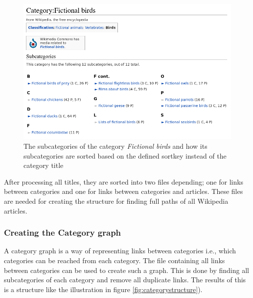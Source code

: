 \begin{figure}[h]
\centering
\includegraphics[width=\textwidth]{Chapters/Implementation/Fictional_birds_2}
\caption{The subcategories of the category \emph{Fictional birds} and how its subcategories are sorted based on the defined sortkey instead of the category title }
\label{fig:fictionalbirds}
\end{figure}


After processing all titles, they are sorted into two files depending; one for links between categories and one for links between categories and articles. These files are needed for creating the structure for finding full paths of all Wikipedia articles. 



\subsubsection{Creating the Category graph}
A category graph is a way of representing links between categories i.e., which categories can be reached from each category. The file containing all links between categories can be used to create such a graph. This is done by finding all subcategories of each category and remove all duplicate links. The results of this is a structure like the illustration in figure \ref{fig:categorystructure}).

